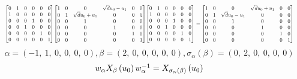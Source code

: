 \documentclass[11pt]{article}
\theoremstyle{definition}
\begin{document}
\[
\scaletoalign{\textwidth}{{\left[\begin{matrix}0 & 1 & 0 & 0 & 0 & 0\\1 & 0 & 0 & 0 & 0 & 0\\0 & 0 & 0 & 1 & 0 & 0\\0 & 0 & 1 & 0 & 0 & 0\\0 & 0 & 0 & 0 & 1 & 0\\0 & 0 & 0 & 0 & 0 & 1\end{matrix}\right]} {\left[\begin{matrix}1 & 0 & 0 & \sqrt{d} u_{0} - u_{1} & 0 & 0\\0 & 1 & \sqrt{d} u_{0} + u_{1} & 0 & 0 & 0\\0 & 0 & 1 & 0 & 0 & 0\\0 & 0 & 0 & 1 & 0 & 0\\0 & 0 & 0 & 0 & 1 & 0\\0 & 0 & 0 & 0 & 0 & 1\end{matrix}\right]} {\left[\begin{matrix}0 & 1 & 0 & 0 & 0 & 0\\1 & 0 & 0 & 0 & 0 & 0\\0 & 0 & 0 & 1 & 0 & 0\\0 & 0 & 1 & 0 & 0 & 0\\0 & 0 & 0 & 0 & 1 & 0\\0 & 0 & 0 & 0 & 0 & 1\end{matrix}\right]} = {\left[\begin{matrix}1 & 0 & 0 & \sqrt{d} u_{0} + u_{1} & 0 & 0\\0 & 1 & \sqrt{d} u_{0} - u_{1} & 0 & 0 & 0\\0 & 0 & 1 & 0 & 0 & 0\\0 & 0 & 0 & 1 & 0 & 0\\0 & 0 & 0 & 0 & 1 & 0\\0 & 0 & 0 & 0 & 0 & 1\end{matrix}\right]}}
\]
\[
\alpha = \left( -1, \  1, \  0, \  0, \  0, \  0\right), \beta = \left( 2, \  0, \  0, \  0, \  0, \  0\right), \sigma_{\alpha}(\beta) = \left( 0, \  2, \  0, \  0, \  0, \  0\right)
\]
\[
\scaletoalign{\textwidth}{w_{\alpha} X_{\beta}\left(u_{0}\right) w_{\alpha}^{-1} = X_{\sigma_{\alpha}\left(\beta\right)}\left(u_{0}\right)}
\]
\end{document}
